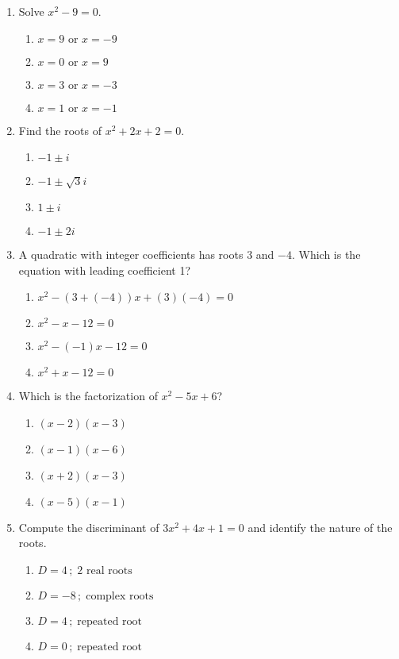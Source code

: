 \documentclass[12pt]{article}
\begin{document}
\begin{enumerate}
\item Solve \(x^2 - 9 = 0\).

\begin{enumerate}
  \item \(x = 9\text{ or }x = -9\)
  \item \(x = 0\text{ or }x = 9\)
  \item \(x = 3\text{ or }x = -3\)
  \item \(x = 1\text{ or }x = -1\)
\end{enumerate}

\item Find the roots of \(x^2 + 2x + 2 = 0\).

\begin{enumerate}
  \item \(-1 \pm i\)
  \item \(-1 \pm \sqrt{3}i\)
  \item \(1 \pm i\)
  \item \(-1 \pm 2i\)
\end{enumerate}

\item A quadratic with integer coefficients has roots \(3\) and \(-4\). Which is the equation with leading coefficient 1?

\begin{enumerate}
  \item \(x^2 - (3 + (-4))x + (3)(-4) = 0\)
  \item \(x^2 - x - 12 = 0\)
  \item \(x^2 - (-1)x - 12 = 0\)
  \item \(x^2 + x - 12 = 0\)
\end{enumerate}

\item Which is the factorization of \(x^2 - 5x + 6\)?

\begin{enumerate}
  \item \((x-2)(x-3)\)
  \item \((x-1)(x-6)\)
  \item \((x+2)(x-3)\)
  \item \((x-5)(x-1)\)
\end{enumerate}

\item Compute the discriminant of \(3x^2 + 4x + 1 = 0\) and identify the nature of the roots.

\begin{enumerate}
  \item \(D = 4\,;\; 2\text{ real roots}\)
  \item \(D = -8\,;\; \text{complex roots}\)
  \item \(D = 4\,;\; \text{repeated root}\)
  \item \(D = 0\,;\; \text{repeated root}\)
\end{enumerate}


\end{enumerate}
\end{document}
